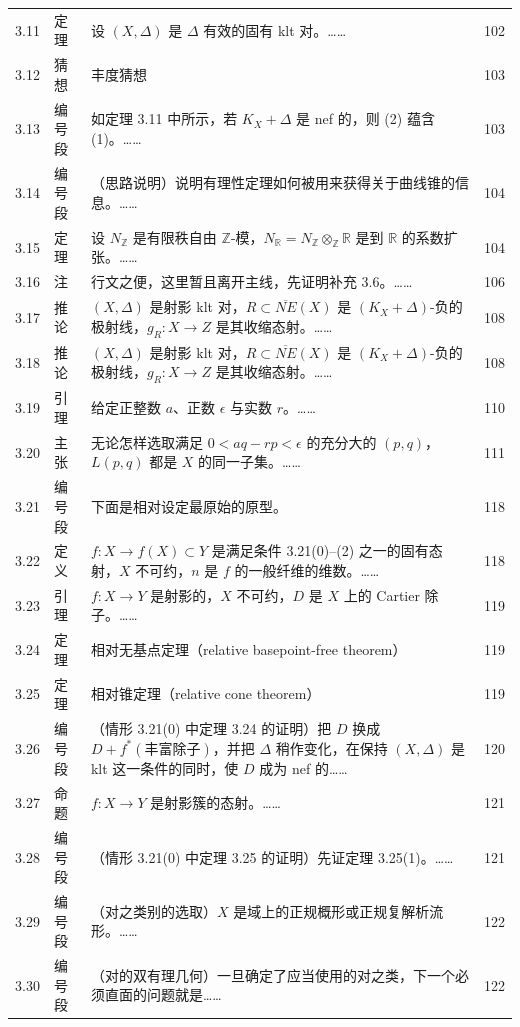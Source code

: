 \begin{longtable}{@{}p{}p{}p{}p{}@{}}
3.11 & 定理 & 设 $(X,\Delta)$ 是 $\Delta$ 有效的固有 klt 对。…… & 102 \\
3.12 & 猜想 & 丰度猜想 & 103 \\
3.13 & 编号段 & 如定理 3.11 中所示，若 $K_X+\Delta$ 是 nef 的，则 (2) 蕴含 (1)。…… & 103 \\
3.14 & 编号段 & （思路说明）\quad 说明有理性定理如何被用来获得关于曲线锥的信息。…… & 104 \\
3.15 & 定理 & 设 $N_{\mathbb{Z}}$ 是有限秩自由 $\mathbb{Z}$-模，$N_{\mathbb{R}}=N_{\mathbb{Z}}\otimes_{\mathbb{Z}}\mathbb{R}$ 是到 $\mathbb{R}$ 的系数扩张。…… & 104 \\
3.16 & 注 & 行文之便，这里暂且离开主线，先证明补充 3.6。…… & 106 \\
3.17 & 推论 & $(X,\Delta)$ 是射影 klt 对，$R\subset\overline{NE}(X)$ 是 $(K_X+\Delta)$-负的极射线，$g_R:X\to Z$ 是其收缩态射。…… & 108 \\
3.18 & 推论 & $(X,\Delta)$ 是射影 klt 对，$R\subset\overline{NE}(X)$ 是 $(K_X+\Delta)$-负的极射线，$g_R:X\to Z$ 是其收缩态射。…… & 108 \\
3.19 & 引理 & 给定正整数 $a$、正数 $\epsilon$ 与实数 $r$。…… & 110 \\
3.20 & 主张 & 无论怎样选取满足 $0<aq-rp<\epsilon$ 的充分大的 $(p,q)$，$L(p,q)$ 都是 $X$ 的同一子集。…… & 111 \\
3.21 & 编号段 & 下面是相对设定最原始的原型。 & 118 \\
3.22 & 定义 & $f:X\to f(X)\subset Y$ 是满足条件 3.21(0)--(2) 之一的固有态射，$X$ 不可约，$n$ 是 $f$ 的一般纤维的维数。…… & 118 \\
3.23 & 引理 & $f:X\to Y$ 是射影的，$X$ 不可约，$D$ 是 $X$ 上的 Cartier 除子。…… & 119 \\
3.24 & 定理 & 相对无基点定理（relative basepoint-free theorem） & 119 \\
3.25 & 定理 & 相对锥定理（relative cone theorem） & 119 \\
3.26 & 编号段 & （情形 3.21(0) 中定理 3.24 的证明）\quad 把 $D$ 换成 $D+f^*(\text{丰富除子})$，并把 $\Delta$ 稍作变化，在保持 $(X,\Delta)$ 是 klt 这一条件的同时，使 $D$ 成为 nef 的…… & 120 \\
3.27 & 命题 & $f:X\to Y$ 是射影簇的态射。…… & 121 \\
3.28 & 编号段 & （情形 3.21(0) 中定理 3.25 的证明）\quad 先证定理 3.25(1)。…… & 121 \\
3.29 & 编号段 & （对之类别的选取）\quad $X$ 是域上的正规概形或正规复解析流形。…… & 122 \\
3.30 & 编号段 & （对的双有理几何）\quad 一旦确定了应当使用的对之类，下一个必须直面的问题就是…… & 122 \\

\end{longtable}
